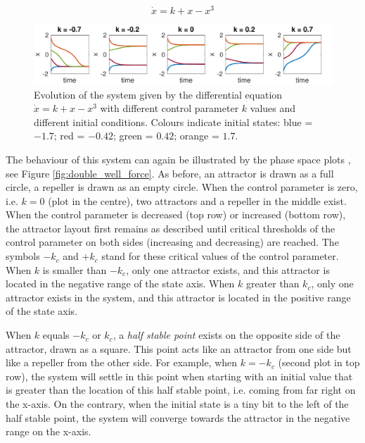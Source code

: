 \begin{equation}
\dot{x} = k + x - x^3
\label{eq:double_well_force}
\end{equation}

\begin{figure}[htp]
\begin{center}
\includegraphics[width=\textwidth]{figures/ch3/evolution_of_double_well.pdf}
\caption[Evolution of the system given by the differential equation $\dot{x} = k + x - x^3$ with different control parameter $k$ values and different initial conditions.]{Evolution of the system given by the differential equation $\dot{x} = k + x - x^3$ with different control parameter $k$ values and different initial conditions. Colours indicate initial states: blue = $-1.7$; red = $-0.42$; green = $0.42$; orange = $1.7$.
}
\label{fig:double_well_evolution}
\end{center}
\end{figure}

The behaviour of this system can again be illustrated by the phase space plots \citep{Fuchs2013}, see Figure \ref{fig:double_well_force}. As before, an attractor is drawn as a full circle, a repeller is drawn as an empty circle. When the control parameter is zero, i.e. $k = 0$ (plot in the centre), two attractors and a repeller in the middle exist. When the control parameter is decreased (top row) or increased (bottom row), the attractor layout first remains as described until critical thresholds of the control parameter on both sides (increasing and decreasing) are reached. The symbols $-k_c$ and $+k_c$ stand for these critical values of the control parameter. When $k$ is smaller than $-k_c$, only one attractor exists, and this attractor is located in the negative range of the state axis. When $k$ greater than $k_c$, only one attractor exists in the system, and this attractor is located in the positive range of the state axis. 

When $k$ equals $-k_c$ or $k_c$, a \emph{half stable point} exists on the opposite side of the attractor, drawn as a square. This point acts like an attractor from one side but like a repeller from the other side. For example, when $k = -k_c$ (second plot in top row), the system will settle in this point when starting with an initial value that is greater than the location of this half stable point, i.e. coming from far right on the x-axis. On the contrary, when the initial state is a tiny bit to the left of the half stable point, the system will converge towards the attractor in the negative range on the x-axis.

